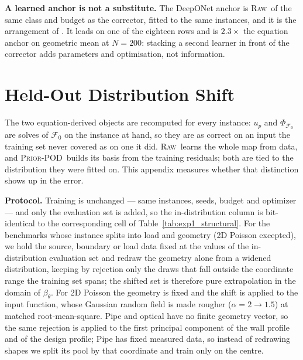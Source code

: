 \documentclass{article}
\newcommand{\armraw}{\textsc{Raw}}
\newcommand{\armpod}{\textsc{Prior-POD}}
\begin{document}
\textbf{A learned anchor is not a substitute.} The DeepONet anchor is \armraw\ of the same class
and budget as the corrector, fitted to the same instances, and it is the arrangement of
\citet{ma2026physics}. It leads on one of the eighteen rows and is $2.3\times$ the equation anchor
on geometric mean at $N=200$: stacking a second learner in front of the corrector adds parameters
and optimisation, not information.

\section{Held-Out Distribution Shift}
\label{app:ood}

The two equation-derived objects are recomputed for every instance: $u_p$ and
$\Phi_{\mathcal{F}_0}$ are solves of $\mathcal{F}_0$ on the instance at hand, so they are as
correct on an input the training set never covered as on one it did. \armraw\ learns the whole
map from data, and \armpod\ builds its basis from the training residuals; both are tied to the
distribution they were fitted on. This appendix measures whether that distinction shows up in
the error.

\textbf{Protocol.} Training is unchanged --- same instances, seeds, budget and optimizer --- and
only the evaluation set is added, so the in-distribution column is bit-identical to the
corresponding cell of Table~\ref{tab:exp1_structural}. For the benchmarks whose instance splits
into load and geometry (2D Poisson excepted), we hold the source, boundary or load data fixed at
the values of the in-distribution evaluation set and redraw the geometry alone from a widened
distribution, keeping by rejection only the draws that fall outside the coordinate range the
training set spans; the shifted set is therefore pure extrapolation in the domain of
$\beta_\theta$. For 2D Poisson the geometry is fixed and the shift is applied to the input
function, whose Gaussian random field is made rougher ($\alpha=2\to1.5$) at matched
root-mean-square. Pipe and optical have no finite geometry vector, so the same rejection is
applied to the first principal component of the wall profile and of the design profile; Pipe has
fixed measured data, so instead of redrawing shapes we split its pool by that coordinate and
train only on the centre.
\end{document}
